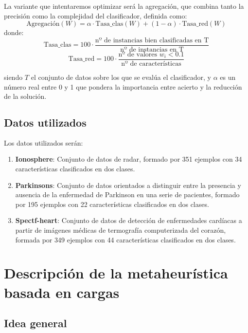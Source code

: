 \documentclass[11pt,a4paper]{article}
\begin{document}
La variante que intentaremos optimizar será la agregación, que combina tanto la precisión como la complejidad del clasificador, definida como:
\begin{equation} \label{eq:objetivo}
\text{Agregación}(W) = \alpha \cdot \text{Tasa\_clas}(W) + (1 - \alpha) \cdot \text{Tasa\_red}(W)
\end{equation}
donde:
\begin{equation} \label{eq:clas}
\text{Tasa\_clas} = 100 \cdot \frac{\text{nº de instancias bien clasificadas en T}}{\text{nº de instancias en T}}
\end{equation}
\begin{equation} \label{eq:red}
\text{Tasa\_red} = 100 \cdot \frac{\text{nº de valores } w_{i} < 0.1}{\text{nº de características}}
\end{equation}

siendo $T$ el conjunto de datos sobre los que se evalúa el clasificador, y $\alpha$ es un número real entre 0 y 1 que pondera la importancia entre acierto y la reducción de la solución.

\subsection{Datos utilizados}

Los datos utilizados serán:
\begin{enumerate}
\item \textbf{Ionosphere}: Conjunto de datos de radar, formado por 351 ejemplos con 34 características clasificados en dos clases.
\item \textbf{Parkinsons}: Conjunto de datos orientados a distinguir entre la presencia y ausencia de la enfermedad de Parkinson en una serie de pacientes, formado por 195 ejemplos con 22 características clasificados en dos clases.
\item \textbf{Spectf-heart}: Conjunto de datos de detección de enfermedades cardíacas a partir de imágenes médicas de termografía computerizada del corazón, formada por 349 ejemplos con 44 características clasificados en dos clases.
\end{enumerate}

\newpage
\section{Descripción de la metaheurística basada en cargas}

\subsection{Idea general}
\end{document}
